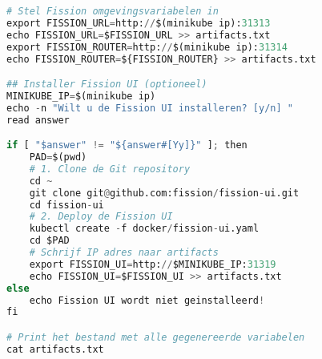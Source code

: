\begin{lstlisting}[language=python]
# Stel Fission omgevingsvariabelen in
export FISSION_URL=http://$(minikube ip):31313
echo FISSION_URL=$FISSION_URL >> artifacts.txt
export FISSION_ROUTER=http://$(minikube ip):31314
echo FISSION_ROUTER=${FISSION_ROUTER} >> artifacts.txt

## Installer Fission UI (optioneel)
MINIKUBE_IP=$(minikube ip)
echo -n "Wilt u de Fission UI installeren? [y/n] "
read answer

if [ "$answer" != "${answer#[Yy]}" ]; then
    PAD=$(pwd)
    # 1. Clone de Git repository
    cd ~
    git clone git@github.com:fission/fission-ui.git
    cd fission-ui
    # 2. Deploy de Fission UI
    kubectl create -f docker/fission-ui.yaml
    cd $PAD
    # Schrijf IP adres naar artifacts
    export FISSION_UI=http://$MINIKUBE_IP:31319
    echo FISSION_UI=$FISSION_UI >> artifacts.txt
else
    echo Fission UI wordt niet geinstalleerd!
fi

# Print het bestand met alle gegenereerde variabelen
cat artifacts.txt
\end{lstlisting}